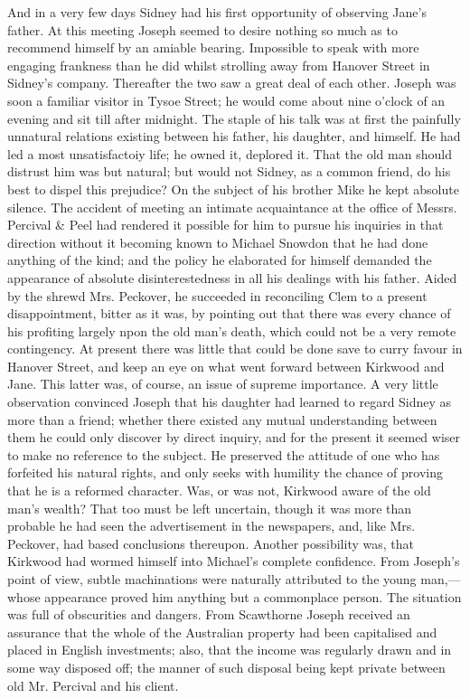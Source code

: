 And in a very few days Sidney had his first opportunity of observing
Jane's father. At this meeting Joseph seemed to desire nothing so much
as to recommend himself by an amiable bearing. Impossible to speak with
more engaging frankness than he did whilst strolling away from Hanover
Street in Sidney's company. Thereafter the two saw a great deal of each
other. Joseph was soon a familiar visitor in Tysoe Street; he would come
about {\protect\hypertarget{100}{}{}}nine o'clock of an evening and sit
till after midnight. The staple of his talk was at first the painfully
unnatural relations existing between his father, his daughter, and
himself. He had led a most unsatisfactoiy life; he owned it, deplored
it. That the old man should distrust him was but natural; but would not
Sidney, as a common friend, do his best to dispel this prejudice? On the
subject of his brother Mike he kept absolute silence. The accident of
meeting an intimate acquaintance at the office of Messrs. Percival \&
Peel had rendered it possible for him to pursue his inquiries in that
direction without it becoming known to Michael Snowdon that he had done
anything of the kind; and the policy he elaborated for himself demanded
the appearance of absolute disinterestedness in all his dealings with
his father. Aided by the shrewd Mrs. Peckover, he succeeded in
reconciling Clem to a present disappointment, bitter as it was, by
pointing out that there was every chance of his profiting largely npon
the old man's death, which could not be a very
{\protect\hypertarget{101}{}{}}remote contingency. At present there was
little that could be done save to curry favour in Hanover Street, and
keep an eye on what went forward between Kirkwood and Jane. This latter
was, of course, an issue of supreme importance. A very little
observation convinced Joseph that his daughter had learned to regard
Sidney as more than a friend; whether there existed any mutual
understanding between them he could only discover by direct inquiry, and
for the present it seemed wiser to make no reference to the subject. He
preserved the attitude of one who has forfeited his natural rights, and
only seeks with humility the chance of proving that he is a reformed
character. Was, or was not, Kirkwood aware of the old man's wealth? That
too must be left uncertain, though it was more than probable he had seen
the advertisement in the newspapers, and, like Mrs. Peckover, had based
conclusions thereupon. Another possibility was, that Kirkwood had wormed
himself into Michael's complete confidence. From Joseph's point of view,
subtle machinations were {\protect\hypertarget{102}{}{}}naturally
attributed to the young man,---whose appearance proved him anything but
a commonplace person. The situation was full of obscurities and dangers.
From Scawthorne Joseph received an assurance that the whole of the
Australian property had been capitalised and placed in English
investments; also, that the income was regularly drawn and in some way
disposed off; the manner of such disposal being kept private between old
Mr. Percival and his client.


